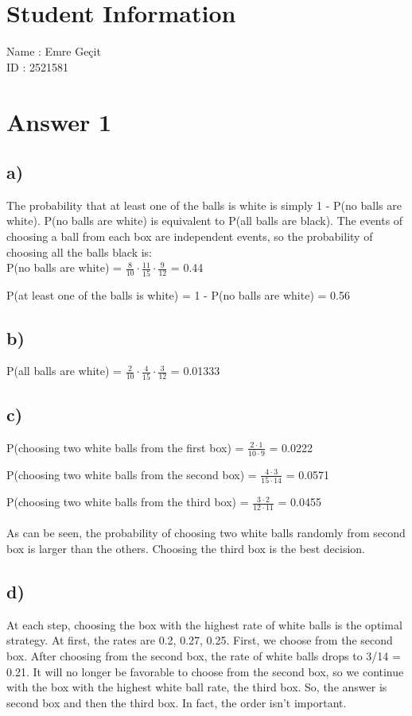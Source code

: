 \documentclass[12pt]{article}
\begin{document}
\section*{Student Information}

Name : Emre Geçit\\

ID : 2521581\\


\section*{Answer 1}
\subsection*{a)} The probability that at least one of the balls is white is simply 1 - P(no balls are white).
P(no balls are white) is equivalent to P(all balls are black). The events of choosing a ball from each box are independent events, so the probability of choosing all the balls black is: \\

P(no balls are white) = $\frac{8}{10} \cdot \frac{11}{15} \cdot \frac{9}{12}$ = 0.44 

P(at least one of the balls is white) = 1 - P(no balls are white) = 0.56
\subsection*{b)} P(all balls are white) = $\frac{2}{10} \cdot \frac{4}{15} \cdot \frac{3}{12}$ = 0.01333
\subsection*{c)}
P(choosing two white balls from the first box) = $\frac{2\cdot 1}{10\cdot 9}$ = 0.0222

P(choosing two white balls from the second box) = $\frac{4\cdot 3}{15\cdot 14}$ = 0.0571

P(choosing two white balls from the third box) = $\frac{3\cdot 2}{12\cdot 11}$ = 0.0455\\\\
As can be seen, the probability of choosing two white balls randomly from second box is larger than the others. Choosing the third box is the best decision.
\subsection*{d)}At each step, choosing the box with the highest rate of white balls is the optimal strategy. At first, the rates are 0.2, 0.27, 0.25. First, we choose from the second box. After choosing from the second box, the rate of white balls drops to 3/14 = 0.21. It will no longer be favorable to choose from the second box, so we continue with the box with the highest white ball rate, the third box. So, the answer is second box and then the third box. In fact, the order isn't important.\newpage
\end{document}
